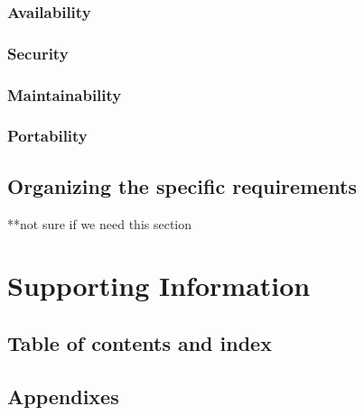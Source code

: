 \documentclass[letterpaper,10pt,draftclsnofoot,onecolumn,titlepage]{IEEEtran}
\begin{document}
	\subsubsection{Availability}
	\subsubsection{Security}
	\subsubsection{Maintainability}
	\subsubsection{Portability}
	
	\subsection{Organizing the specific requirements}
	**not sure if we need this section
	
	\section{Supporting Information}
	\subsection{Table of contents and index}
	\subsection{Appendixes}
 
\end{document}

